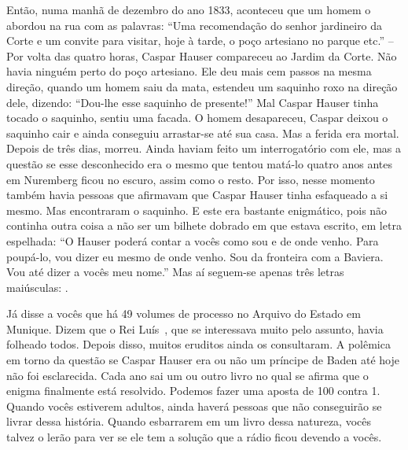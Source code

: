 Então, numa manhã de dezembro do ano 1833, aconteceu que um homem o
abordou na rua com as palavras: ``Uma recomendação do senhor jardineiro
da Corte e um convite para visitar, hoje à tarde, o poço artesiano no
parque etc.'' -- Por volta das quatro horas, Caspar Hauser compareceu ao
Jardim da Corte. Não havia ninguém perto do poço artesiano. Ele deu mais
cem passos na mesma direção, quando um homem saiu da mata, estendeu um
saquinho roxo na direção dele, dizendo: ``Dou-lhe esse saquinho de
presente!'' Mal Caspar Hauser tinha tocado o saquinho, sentiu uma
facada. O homem desapareceu, Caspar deixou o saquinho cair e ainda
conseguiu arrastar-se até sua casa. Mas a ferida era mortal. Depois de
três dias, morreu. Ainda haviam feito um interrogatório com ele, mas a
questão se esse desconhecido era o mesmo que tentou matá-lo quatro anos
antes em Nuremberg ficou no escuro, assim como o resto. Por isso, nesse
momento também havia pessoas que afirmavam que Caspar Hauser tinha
esfaqueado a si mesmo. Mas encontraram o saquinho. E este era bastante
enigmático, pois não continha outra coisa a não ser um bilhete dobrado
em que estava escrito, em letra espelhada: ``O Hauser poderá contar a
vocês como sou e de onde venho. Para poupá-lo, vou dizer eu mesmo de
onde venho. Sou da fronteira com a Baviera. Vou até dizer a vocês meu
nome.'' Mas aí seguem-se apenas três letras maiúsculas: .

Já disse a vocês que há 49 volumes de processo no Arquivo do Estado em
Munique. Dizem que o Rei Luís~, que se interessava muito pelo assunto,
havia folheado todos. Depois disso, muitos eruditos ainda os
consultaram. A polêmica em torno da questão se Caspar Hauser era ou não
um príncipe de Baden até hoje não foi esclarecida. Cada ano sai um ou
outro livro no qual se afirma que o enigma finalmente está resolvido.
Podemos fazer uma aposta de 100 contra 1. Quando vocês estiverem
adultos, ainda haverá pessoas que não conseguirão se livrar dessa
história. Quando esbarrarem em um livro dessa natureza, vocês talvez o
lerão para ver se ele tem a solução que a rádio ficou devendo a vocês.




